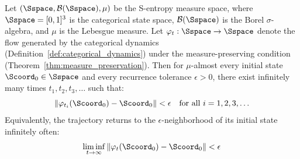 \begin{theorem}
\label{thm:poincare_recurrence}
Let $(\Sspace, \mathcal{B}(\Sspace), \mu)$ be the S-entropy measure space, where $\Sspace = [0,1]^3$ is the categorical state space, $\mathcal{B}(\Sspace)$ is the Borel $\sigma$-algebra, and $\mu$ is the Lebesgue measure. Let $\varphi_t: \Sspace \to \Sspace$ denote the flow generated by the categorical dynamics (Definition~\ref{def:categorical_dynamics}) under the measure-preserving condition (Theorem~\ref{thm:measure_preservation}). Then for $\mu$-almost every initial state $\Scoord_0 \in \Sspace$ and every recurrence tolerance $\epsilon > 0$, there exist infinitely many times $t_1, t_2, t_3, \ldots$ such that:
\begin{equation}
\|\varphi_{t_i}(\Scoord_0) - \Scoord_0\| < \epsilon \quad \text{for all } i = 1, 2, 3, \ldots
\label{eq:recurrence_condition}
\end{equation}
Equivalently, the trajectory returns to the $\epsilon$-neighborhood of its initial state infinitely often:
\begin{equation}
\liminf_{t \to \infty} \|\varphi_t(\Scoord_0) - \Scoord_0\| < \epsilon
\label{eq:liminf_recurrence}
\end{equation}
\end{theorem}

